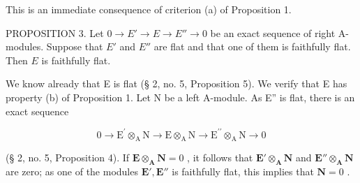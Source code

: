 This is an immediate consequence of criterion (a) of Proposition 1.

PROPOSITION 3. Let \(0 \to E' \to E \to E'' \to 0\) be an exact sequence of right A-modules. Suppose that \(E'\) and \(E''\) are flat and that one of them is faithfully flat. Then \(E\) is faithfully flat.

We know already that E is flat (§ 2, no. 5, Proposition 5). We verify that E has property (b) of Proposition 1. Let N be a left A-module. As E'' is flat, there is an exact sequence

\[
0 \rightarrow \mathrm{E} ^ {\prime} \otimes_ {\mathrm{A}} \mathrm{N} \rightarrow \mathrm{E} \otimes_ {\mathrm{A}} \mathrm{N} \rightarrow \mathrm{E} ^ {\prime \prime} \otimes_ {\mathrm{A}} \mathrm{N} \rightarrow 0
\]

(§ 2, no. 5, Proposition 4). If \(\mathbf{E} \otimes_{\mathbf{A}} \mathbf{N} = 0\) , it follows that \(\mathbf{E}' \otimes_{\mathbf{A}} \mathbf{N}\) and \(\mathbf{E}'' \otimes_{\mathbf{A}} \mathbf{N}\) are zero; as one of the modules \(\mathbf{E}', \mathbf{E}''\) is faithfully flat, this implies that \(\mathbf{N} = 0\) .

